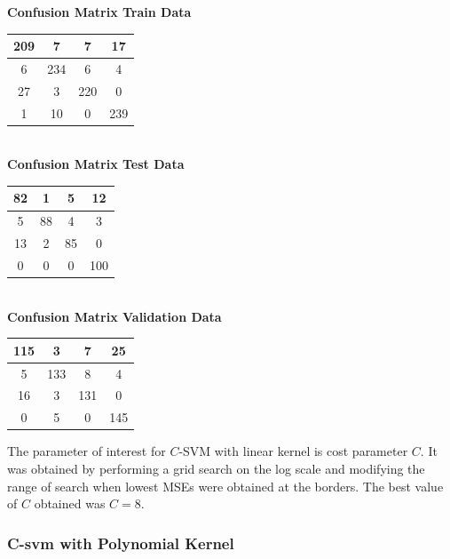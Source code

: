 \documentclass{article}
\begin{document}
\begin{flushleft}
\textbf{Confusion Matrix Train Data\\[5pt]}
\begin{tabular}{|c|c|c|c|}
\hline
209 & 7 & 7 & 17 \\
\hline
6 & 234 & 6 & 4 \\
\hline
27 & 3 & 220 & 0 \\
\hline
1 & 10 & 0 & 239 \\
\hline
\end{tabular}
\textbf{\\[10pt] Confusion Matrix Test Data \\[5pt]}
\begin{tabular}{|c|c|c|c|}
\hline
82 & 1 & 5 & 12 \\
\hline
5 & 88 & 4 & 3 \\
\hline
13 & 2 & 85 & 0 \\
\hline
0 & 0 & 0 & 100 \\
\hline
\end{tabular}
\textbf{\\[10pt] Confusion Matrix Validation Data \\[5pt]}
\begin{tabular}{|c|c|c|c|}
\hline
115 & 3 & 7 & 25 \\
\hline
5 & 133 & 8 & 4 \\
\hline
16 & 3 & 131 & 0 \\
\hline
0 & 5 & 0 & 145 \\
\hline
\end{tabular}
\end{flushleft}


The parameter of interest for $C$-SVM with linear kernel is cost parameter $C$. It was obtained by performing a grid search on the log scale and modifying the range of search when lowest MSEs were obtained at the borders.
The best value of $C$ obtained was $C=8$. 


\subsubsection{C-svm with Polynomial Kernel}
\end{document}

